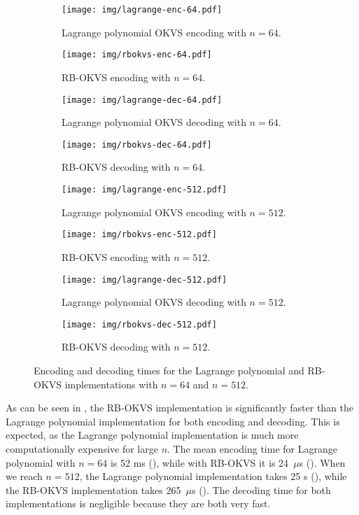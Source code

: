 \begin{figure}
	\begin{subfigure}{.5\textwidth}
		\centering
		\texttt{[image: img/lagrange-enc-64.pdf]}
		\caption{Lagrange polynomial OKVS encoding with $n=64$.}
		\label{fig:lagrange-enc-64}
	\end{subfigure}%
	\begin{subfigure}{.5\textwidth}
		\centering
		\texttt{[image: img/rbokvs-enc-64.pdf]}
		\caption{RB-OKVS encoding with $n=64$.}
		\label{fig:rbokvs-enc-64}
	\end{subfigure}
	\begin{subfigure}{.5\textwidth}
		\centering
		\texttt{[image: img/lagrange-dec-64.pdf]}
		\caption{Lagrange polynomial OKVS decoding with $n=64$.}
	\end{subfigure}%
	\begin{subfigure}{.5\textwidth}
		\centering
		\texttt{[image: img/rbokvs-dec-64.pdf]}
		\caption{RB-OKVS decoding with $n=64$.}
	\end{subfigure}
	\begin{subfigure}{.5\textwidth}
		\centering
		\texttt{[image: img/lagrange-enc-512.pdf]}
		\caption{Lagrange polynomial OKVS encoding with $n=512$.}
		\label{fig:lagrange-enc-512}
	\end{subfigure}%
	\begin{subfigure}{.5\textwidth}
		\centering
		\texttt{[image: img/rbokvs-enc-512.pdf]}
		\caption{RB-OKVS encoding with $n=512$.}
		\label{fig:rbokvs-enc-512}
	\end{subfigure}
	\begin{subfigure}{.5\textwidth}
		\centering
		\texttt{[image: img/lagrange-dec-512.pdf]}
		\caption{Lagrange polynomial OKVS decoding with $n=512$.}
	\end{subfigure}%
	\begin{subfigure}{.5\textwidth}
		\centering
		\texttt{[image: img/rbokvs-dec-512.pdf]}
		\caption{RB-OKVS decoding with $n=512$.}
	\end{subfigure}
	\caption{Encoding and decoding times for the Lagrange polynomial and RB-OKVS implementations with $n=64$ and $n=512$.}
	\label{fig:okvs-benchmarks}
\end{figure}

As can be seen in , the RB-OKVS implementation is significantly faster than the Lagrange polynomial implementation for both encoding and decoding. This is expected, as the Lagrange polynomial implementation is much more computationally expensive for large $n$. The mean encoding time for Lagrange polynomial with $n=64$ is 52 ms (), while with RB-OKVS it is 24~$\mu$s (). When we reach $n=512$, the Lagrange polynomial implementation takes 25 s (), while the RB-OKVS implementation takes 265~$\mu$s (). The decoding time for both implementations is negligible because they are both very fast.


